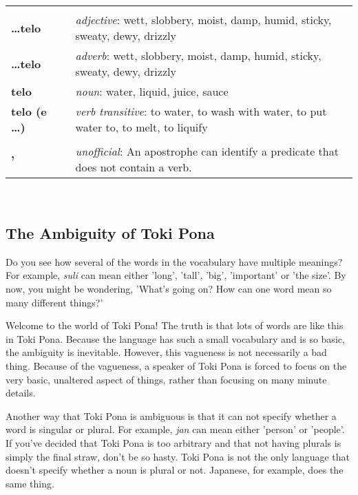 \begin{supertabular}{p{2,5cm}|ll}
 && \\ %
%
\textbf{\dots telo} && \textit{adjective}: wett, slobbery, moist, damp, humid, sticky, sweaty, dewy, drizzly \\ %
\textbf{\dots telo} && \textit{adverb}: wett, slobbery, moist, damp, humid, sticky, sweaty, dewy, drizzly \\ %
\textbf{telo} && \textit{noun}: water, liquid, juice, sauce \\ %
\textbf{telo (e \dots)} && \textit{verb transitive}: to water, to wash with water, to put water to, to melt, to liquify \\ %
 && \\ %
%
\textbf{'} && \textit{unofficial}: An apostrophe can identify a predicate that does not contain a verb.  \\ %
%
\end{supertabular} \\
%
\newpage
\subsection*{The Ambiguity of Toki Pona}
%
%
Do you see how several of the words in the vocabulary have multiple meanings? 
For example, \textit{suli} can mean either 'long', 'tall', 'big', 'important' or 'the size'. 
By now, you might be wondering, 'What's going on? How can one word mean so many different things?' 

Welcome to the world of Toki Pona! The truth is that lots of words are like this in Toki Pona. 
Because the language has such a small vocabulary and is so basic, the ambiguity is inevitable. 
However, this vagueness is not necessarily a bad thing. Because of the vagueness, a speaker of Toki Pona is forced to focus on the very basic, unaltered aspect of things, rather than focusing on many minute details. 

Another way that Toki Pona is ambiguous is that it can not specify whether a word is singular or plural. 
For example, \textit{jan} can mean either 'person' or 'people'. 
If you've decided that Toki Pona is too arbitrary and that not having plurals is simply the final straw, don't be so hasty. 
Toki Pona is not the only language that doesn't specify whether a noun is plural or not. 
Japanese, for example, does the same thing. 

